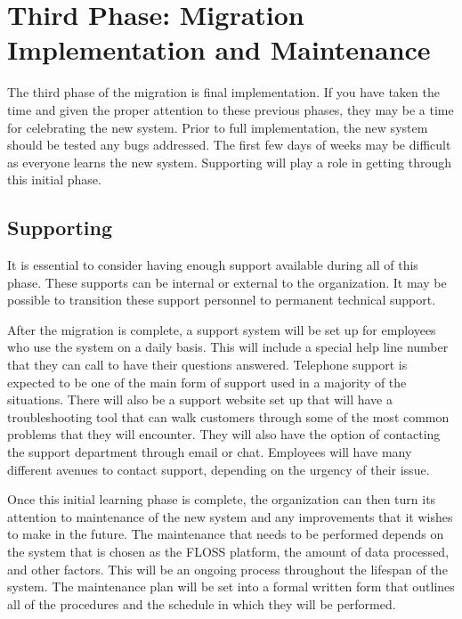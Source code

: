      \section{Third Phase: Migration Implementation and Maintenance}
     \label{Implementation}
     
     The third phase of the migration is final implementation. If you have taken the time and given the proper attention to these previous phases, they may be a time for celebrating the new system. Prior to full implementation, the new system should be tested any bugs addressed. The first few days of weeks may be difficult as everyone learns the new system. Supporting will play a role in getting through this initial phase. 
     \subsection {Supporting}
     
     It is essential to consider having enough support available during all of this phase. These supports can be internal or external to the organization. It may be possible to transition these support personnel to permanent technical support. 
     
     After the migration is complete, a support system will be set up for employees who use the system on a daily basis. This will include a special help line number that they can call to have their questions answered. Telephone support is expected to be one of the main form of support used in a majority of the situations. 	There will also be a support website set up that will have a troubleshooting tool that can walk customers through some of the most common problems that they will encounter. They will also have the option of contacting the support department through email or chat. Employees will have many different avenues to contact support, depending on the urgency of their issue. 
     
     Once this initial learning phase is complete, the organization can then turn its attention to maintenance of the new system and any improvements that it wishes to make in the future. The maintenance that needs to be performed depends on the system that is chosen as the FLOSS platform, the amount of data processed, and other factors. This will be an ongoing process throughout the lifespan of the system. The maintenance plan will be set into a formal written form that outlines all of the procedures and the schedule in which they will be performed. 

